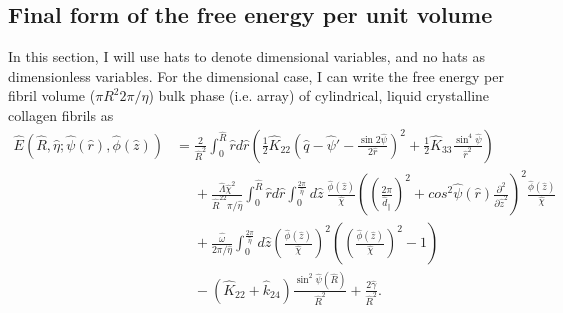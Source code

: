 \documentclass[12pt]{article}
\begin{document}
\subsection{Final form of the free energy per unit volume}
In this section, I will use hats to denote dimensional variables, and no hats as dimensionless variables. For the dimensional case, I can write the free energy per fibril volume ($\pi R^2 2\pi/\eta$) bulk phase (i.e. array) of cylindrical, liquid crystalline collagen fibrils as
\begin{align}
\hat{E}(\hat{R},\hat{\eta};\hat{\psi}(\hat{r}),\hat{\phi}(\hat{z}))&=\frac{2}{\hat{R}^2}\int_0^{\hat{R}}\hat{r}d\hat{r}\left(\frac{1}{2}\hat{K}_{22}\left(\hat{q}-\hat{\psi}'-\frac{\sin2\hat{\psi}}{2\hat{r}}\right)^2+\frac{1}{2}\hat{K}_{33}\frac{\sin^4\hat{\psi}}{\hat{r}^2}\right)\nonumber\\
&\phantom{=}+\frac{\hat{\Lambda}\hat{\chi}^2}{\hat{R}^22\pi/\hat{\eta}}\int_0^{\hat{R}}\hat{r}d\hat{r}\int_0^{\frac{2\pi}{\hat{\eta}}}d\hat{z}\:\frac{\hat{\phi}(\hat{z})}{\hat{\chi}}\left(\left(\frac{2\pi}{\hat{d}_{\parallel}}\right)^2+cos^2\hat{\psi}(\hat{r})\frac{\partial^2}{\partial \hat{z}^2}\right)^2\!\!\frac{\hat{\phi}(\hat{z})}{\hat{\chi}}\nonumber\\
&\phantom{=}+\frac{\hat{\omega}}{2\pi/\hat{\eta}}\int_0^{\frac{2\pi}{\hat{\eta}}}d\hat{z}\left(\frac{\hat{\phi}(\hat{z})}{\hat{\chi}}\right)^2\left(\left(\frac{\hat{\phi}(\hat{z})}{\hat{\chi}}\right)^2-1\right)\nonumber\\
&\phantom{=}-(\hat{K}_{22}+\hat{k}_{24})\frac{\sin^2\hat{\psi}(\hat{R})}{\hat{R}^2}+\frac{2\hat{\gamma}}{\hat{R}^2}.
\end{align}
\end{document}
